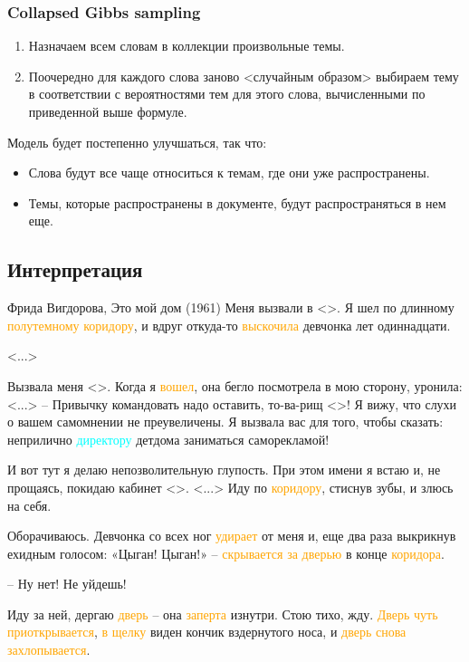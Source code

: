 \documentclass[10pt,svgnames]{beamer}
\begin{document}
\begin{frame}
  \frametitle{Collapsed Gibbs sampling}
  \begin{enumerate}
  \item Назначаем всем словам в коллекции произвольные темы.
  \item Поочередно для каждого слова заново <случайным образом>
    выбираем тему в соответствии с вероятностями тем для этого слова,
    вычисленными по приведенной выше формуле.
  \end{enumerate}
  Модель будет постепенно улучшаться, так что:
  \begin{itemize}
  \item Слова будут все чаще относиться к темам, где они уже
    распространены.
  \item Темы, которые распространены в документе, будут
    распространяться в нем еще.
  \end{itemize}
\end{frame}

\subsection{Интерпретация}

\begin{frame}
  \footnotesize
  \begin{block}{Фрида Вигдорова, Это мой дом (1961)}
Меня вызвали в <>. Я шел по длинному \textcolor{orange}{полутемному коридору}, и вдруг
откуда-то \textcolor{orange}{выскочила} девчонка лет одиннадцати.

<...>

Вызвала меня <>. Когда я \textcolor{orange}{вошел}, она бегло
посмотрела в мою сторону, уронила: <...> – Привычку командовать надо
оставить, то-ва-рищ <>! Я вижу, что слухи о вашем самомнении не
преувеличены. Я вызвала вас для того, чтобы сказать: неприлично
\textcolor{cyan}{директору} детдома заниматься саморекламой!

И вот тут я делаю непозволительную глупость. При этом имени я встаю и,
не прощаясь, покидаю кабинет <>. <...>
Иду по \textcolor{orange}{коридору}, стиснув зубы, и злюсь на себя.

Оборачиваюсь. Девчонка со всех ног \textcolor{orange}{удирает} от меня и, еще два раза
выкрикнув ехидным голосом: «Цыган! Цыган!» – \textcolor{orange}{скрывается за дверью} в
конце \textcolor{orange}{коридора}.

– Ну нет! Не уйдешь!

Иду за ней, дергаю \textcolor{orange}{дверь} – она \textcolor{orange}{заперта} изнутри. Стою тихо, жду. \textcolor{orange}{Дверь
чуть приоткрывается}, \textcolor{orange}{в щелку} виден кончик вздернутого носа, и \textcolor{orange}{дверь
снова захлопывается}.
  \end{block}
\end{frame}
\end{document}
